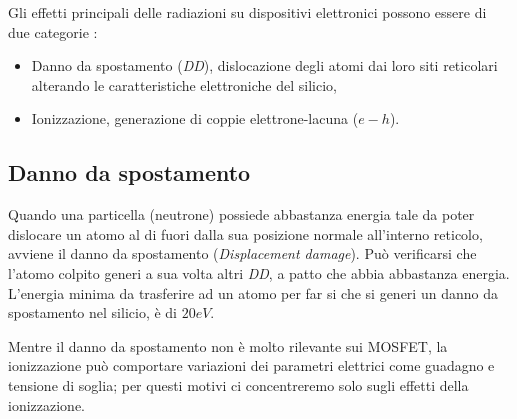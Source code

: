 
Gli effetti principali delle radiazioni su dispositivi elettronici possono essere di due categorie \cite{bib:Effetti_Radiazioni_1987}:
\begin{itemize}
	\item Danno da spostamento {(\textit{DD})}, dislocazione degli atomi dai loro siti reticolari alterando le caratteristiche elettroniche del silicio,
	\item Ionizzazione, generazione di coppie elettrone-lacuna ($e-h$).
\end{itemize}

\subsection{Danno da spostamento}
Quando una particella (neutrone) possiede abbastanza energia tale da poter dislocare un atomo al di fuori dalla sua posizione normale all'interno reticolo, avviene il danno da spostamento (\textit{Displacement damage}).
Può verificarsi che l'atomo colpito generi a sua volta altri \textit{DD}, a patto che abbia abbastanza energia. L'energia minima da trasferire ad un atomo per far si che si generi un danno da spostamento nel silicio, è di $20 eV$.


\vspace*{0.5cm}

Mentre il danno da spostamento non è molto rilevante sui MOSFET, la ionizzazione può comportare variazioni dei parametri elettrici come guadagno e tensione di soglia; per questi motivi ci concentreremo solo sugli effetti della ionizzazione.

 

